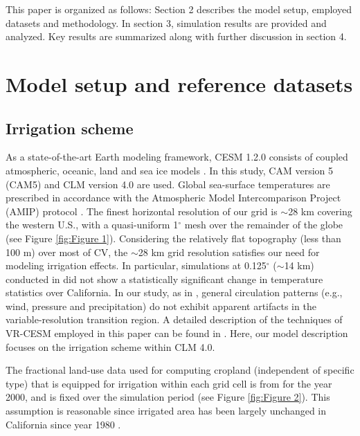 \documentclass[draft,ms]{agutex}   %
\begin{document}
\begin{article}
This paper is organized as follows: Section 2 describes the model setup, employed datasets and methodology. In section 3, simulation results are provided and analyzed. Key results are summarized along with further discussion in section 4.

\section{Model setup and reference datasets}

\subsection{Irrigation scheme}

As a state-of-the-art Earth modeling framework, CESM 1.2.0 consists of coupled atmospheric, oceanic, land and sea ice models \citep{CAM5Tech, hurrell2013community}. In this study, CAM version 5 (CAM5) \citep{CAM5Tech} and CLM version 4.0 \citep{CLM40Tech} are used.  Global sea-surface temperatures are prescribed in accordance with the Atmospheric Model Intercomparison Project (AMIP) protocol \citep{Gates1992}.  The finest horizontal resolution of our grid is $\sim$28 km covering the western U.S., with a quasi-uniform 1$^\circ$ mesh over the remainder of the globe (see Figure \ref{fig:Figure 1}). Considering the relatively flat topography (less than 100 m) over most of CV, the $\sim$28 km grid resolution satisfies our need for modeling irrigation effects. In particular, simulations at 0.125$^\circ$ ($\sim$14 km) conducted in \cite{huang2016evaluation} did not show a statistically significant change in temperature statistics over California.  In our study, as in \cite{zarzycki2015effects}, general circulation patterns (e.g., wind, pressure and precipitation) do not exhibit apparent artifacts in the variable-resolution transition region. A detailed description of the techniques of VR-CESM employed in this paper can be found in \cite{rhoades2015characterizing}. Here, our model description focuses on the irrigation scheme within CLM 4.0.

The fractional land-use data used for computing cropland (independent of specific type) that is equipped for irrigation within each grid cell is from \citet{siebert2005development} for the year 2000, and is fixed over the simulation period (see Figure \ref{fig:Figure 2}). This assumption is reasonable since irrigated area has been largely unchanged in California since year 1980 \citep{bonfils2007empirical}. 


\end{article}
\end{document}
